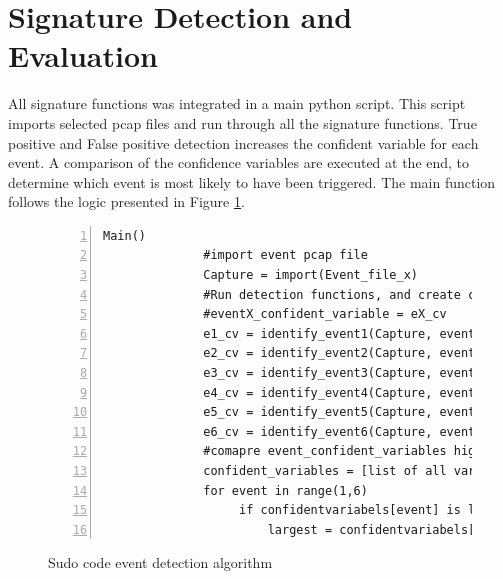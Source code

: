 \section{Signature Detection and Evaluation}
All signature functions was integrated in a main python script. This script imports selected pcap files and run through all the signature functions. True positive and False positive detection increases the confident variable for each event. A comparison of the confidence variables are executed at the end, to determine which event is most likely to have been triggered. The main function follows the logic presented in Figure \ref{fig:Sudo_code_event_detection_alg}.

\begin{figure}[H]
    \centering
    \caption{Sudo code event detection algorithm}
    \label{fig:Sudo_code_event_detection_alg}
    \begin{lstlisting}[numbers=left]
         Main()
              #import event pcap file
              Capture = import(Event_file_x)
              #Run detection functions, and create confidence variables
              #eventX_confident_variable = eX_cv  
              e1_cv = identify_event1(Capture, event1_confodence_variable)
              e2_cv = identify_event2(Capture, event1_confodence_variable)
              e3_cv = identify_event3(Capture, event1_confodence_variable)
              e4_cv = identify_event4(Capture, event1_confodence_variable)
              e5_cv = identify_event5(Capture, event1_confodence_variable)
              e6_cv = identify_event6(Capture, event1_confodence_variable)
              #comapre event_confident_variables highest is event
              confident_variables = [list of all variables]
              for event in range(1,6)
                   if confidentvariabels[event] is larger then last number
                       largest = confidentvariabels[event]  
    \end{lstlisting}
\end{figure}

